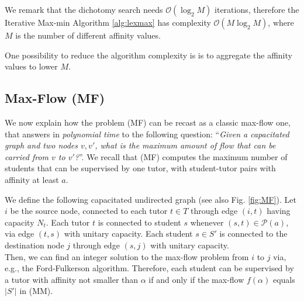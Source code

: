 \documentclass[11pt,oneside,a4paper]{article}     %
\begin{document}
We remark that the dichotomy search needs $\mathcal O(\log_2 M)$ iterations, therefore the Iterative Max-min Algorithm \ref{alg:lexmax} has complexity $\mathcal O(M\log_2 M)$, where $M$ is the number of different affinity values.

One possibility to reduce the algorithm complexity is is to aggregate the affinity values to lower $M$.

\subsection{Max-Flow (MF)} \label{sec:MF}


We now explain how the problem (MF) can be recast as a classic max-flow one, that answers in \emph{polynomial time} to the following question: ``\emph{Given a capacitated graph and two nodes $v,v'$, what is the maximum amount of flow that can be carried from $v$ to $v'$?}''. We recall that (MF) computes the maximum number of students that can be supervised by one tutor, with student-tutor pairs with affinity at least $a$.

We define the following capacitated undirected graph (see also Fig. \ref{fig:MF}). Let $i$ be the source node, connected to each tutor $t\in T$ through edge $(i,t)$ having capacity $N_t$. Each tutor $t$ is connected to student $s$ whenever $(s,t)\in \mathcal P(a)$, via edge $(t,s)$ with unitary capacity. Each student $s\in S'$ is connected to the destination node $j$ through edge $(s,j)$ with unitary capacity.\\
Then, we can find an integer solution to the max-flow problem from $i$ to $j$ via, e.g., the Ford-Fulkerson algorithm. Therefore, each student can be supervised by a tutor with affinity not smaller than $\alpha$ if and only if the max-flow $f(\alpha)$ equals $|S'|$ in (MM).
\end{document}

